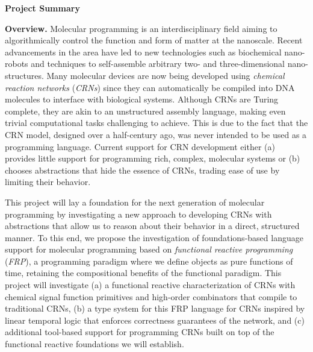 \documentclass[11pt]{article}
\begin{document}
    \setcounter{page}{1}
    \begin{center}
        {\Large {\bf Project Summary}}
    \end{center}
    \vspace*{1em}

    \textbf{Overview.}
    Molecular programming is an interdisciplinary field aiming to algorithmically control the function and form of matter at the nanoscale.
    Recent advancements in the area have led to new technologies such as biochemical nano-robots and techniques to self-assemble arbitrary two- and three-dimensional nano-structures.
    Many molecular devices are now being developed using \emph{chemical reaction networks} (\emph{CRNs}) since they can automatically be compiled into DNA molecules to interface with biological systems.
    Although CRNs are Turing complete, they are akin to an unstructured assembly language, making even trivial computational tasks challenging to achieve.
    This is due to the fact that the CRN model, designed over a half-century ago, was never intended to be used as a programming language.
    Current support for CRN development either (a) provides little support for programming rich, complex, molecular systems or (b) chooses abstractions that hide the essence of CRNs, trading ease of use by limiting their behavior.

    This project will lay a foundation for the next generation of molecular programming by investigating a new approach to developing CRNs with abstractions that allow us to reason about their behavior in a direct, structured manner.
    To this end, we propose the investigation of foundations-based language support for molecular programming based on \emph{functional reactive programming} (\emph{FRP}), a programming paradigm where we define objects as pure functions of time, retaining the compositional benefits of the functional paradigm. 
    This project will investigate (a) a functional reactive characterization of CRNs with chemical signal function primitives and high-order combinators that compile to traditional CRNs, (b) a type system for this FRP language for CRNs inspired by linear temporal logic that enforces correctness guarantees of the network, and (c) additional tool-based support for programming CRNs built on top of the functional reactive foundations we will establish.
\end{document}

